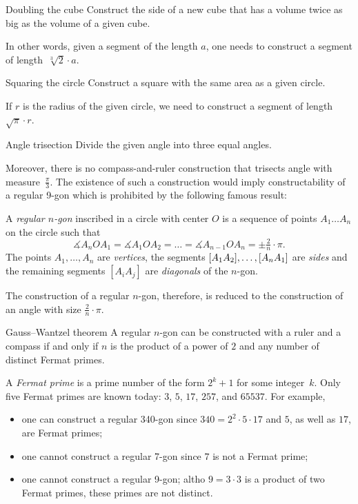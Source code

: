\begin{thm*}{Doubling the cube}
Construct the side of a new cube 
that has a volume twice as big as the volume of a given cube. 
\end{thm*}

In other words, 
given a segment of the length $a$,
one needs to construct a segment of length~$\sqrt[3]{2}\cdot a$.

\begin{thm*}{Squaring the circle}
Construct a square with the same area as a given circle.
\end{thm*}

If $r$ is the radius of the given circle, we need to construct a segment of length~$\sqrt{\pi}\cdot r$. 

\begin{thm*}{Angle trisection} 
Divide the given angle into three equal angles.
\end{thm*}

Moreover, there is no compass-and-ruler construction that trisects angle with measure~$\tfrac\pi3$. 
The existence of such a construction would imply constructability of a regular 9-gon which is prohibited by the following famous result:

A \emph{regular $n$-gon} inscribed in a circle with center $O$ is a sequence of points $A_1\dots A_n$ on the circle such that 
\[\measuredangle A_nOA_1=\measuredangle A_1OA_2=\dots=\measuredangle A_{n-1}OA_n=\pm\tfrac2n\cdot \pi.\]
The points $A_1,\dots, A_n$ are \emph{vertices},
the segments $[A_1A_2], \z\dots, [A_nA_1]$ are \emph{sides} 
and the remaining segments $[A_iA_j]$ are \emph{diagonals} of the $n$-gon.

The construction of a regular $n$-gon, therefore, is reduced to the construction of an angle with size $\tfrac2n\cdot \pi$.

\begin{thm}{Gauss--Wantzel theorem}
A regular $n$-gon can be constructed with a ruler and a compass 
if and only if 
$n$ is the product of a power of $2$ and any number of distinct Fermat primes.
\end{thm}

A \emph{Fermat prime} is a prime number of the form $2^k+1$ for some integer~$k$.
Only five Fermat primes are known  today: $3$, $5$, $17$, $257$, and $65537$.
For example, 
\begin{itemize}
\item one can construct a regular 340-gon since $340=2^2\cdot 5\cdot 17$ and $5$, as well as $17$, are Fermat primes;
\item one cannot construct a regular 7-gon since $7$ is not a Fermat prime;
\item one cannot construct a regular 9-gon; 
altho $9=3\cdot 3$ is a product of two Fermat primes, 
these primes are not distinct.
\end{itemize}

